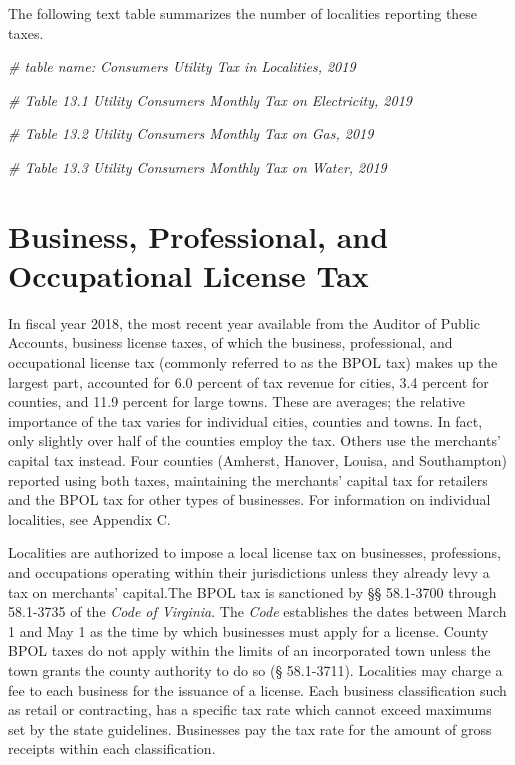 \documentclass[
]{book}
\newenvironment{Shaded}{\begin{snugshade}}{\end{snugshade}}
\newcommand{\CommentTok}[1]{\textcolor[rgb]{0.56,0.35,0.01}{\textit{#1}}}
\begin{document}
The following text table summarizes the number of localities reporting these taxes.

\begin{Shaded}
\begin{Highlighting}[]
\CommentTok{\# table name: Consumers\textquotesingle{} Utility Tax in Localities, 2019}
\end{Highlighting}
\end{Shaded}

\begin{Shaded}
\begin{Highlighting}[]
\CommentTok{\# Table 13.1 Utility Consumers\textquotesingle{} Monthly Tax on Electricity, 2019}

\CommentTok{\# Table 13.2 Utility Consumers\textquotesingle{} Monthly Tax on Gas, 2019}

\CommentTok{\# Table 13.3 Utility Consumers\textquotesingle{} Monthly Tax on Water, 2019}
\end{Highlighting}
\end{Shaded}

\hypertarget{business-professional-and-occupational-license-tax}{%
\chapter{Business, Professional, and Occupational License Tax}\label{business-professional-and-occupational-license-tax}}

In fiscal year 2018, the most recent year available from the Auditor of Public Accounts, business license taxes, of which the business, professional, and occupational license tax (commonly referred to as the BPOL tax) makes up the largest part, accounted for 6.0 percent of tax revenue for cities, 3.4 percent for counties, and 11.9 percent for large towns. These are averages; the relative importance of the tax varies for individual cities, counties and towns. In fact, only slightly over half of the counties employ the tax. Others use the merchants' capital tax instead. Four counties (Amherst, Hanover, Louisa, and Southampton) reported using both taxes, maintaining the merchants' capital tax for retailers and the BPOL tax for other types of businesses. For information on individual localities, see Appendix C.

Localities are authorized to impose a local license tax on businesses, professions, and occupations operating within their jurisdictions unless they already levy a tax on merchants' capital.The BPOL tax is sanctioned by §§ 58.1-3700 through 58.1-3735 of the \emph{Code of Virginia}. The \emph{Code} establishes the dates between March 1 and May 1 as the time by which businesses must apply for a license. County BPOL taxes do not apply within the limits of an incorporated town unless the town grants the county authority to do so (§ 58.1-3711). Localities may charge a fee to each business for the issuance of a license. Each business classification such as retail or contracting, has a specific tax rate which cannot exceed maximums set by the state guidelines. Businesses pay the tax rate for the amount of gross receipts within each classification.
\end{document}
